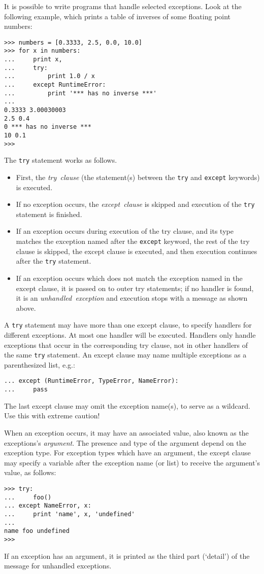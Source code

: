 It is possible to write programs that handle selected exceptions.
Look at the following example, which prints a table of inverses of
some floating point numbers:
\bcode\begin{verbatim}
>>> numbers = [0.3333, 2.5, 0.0, 10.0]
>>> for x in numbers:
...     print x,
...     try:
...         print 1.0 / x
...     except RuntimeError:
...         print '*** has no inverse ***'
...
0.3333 3.00030003
2.5 0.4
0 *** has no inverse ***
10 0.1
>>>
\end{verbatim}\ecode
The {\tt try} statement works as follows.
\begin{itemize}
\item
First, the
{\em try\ clause}
(the statement(s) between the {\tt try} and {\tt except} keywords) is
executed.
\item
If no exception occurs, the
{\em except\ clause}
is skipped and execution of the {\tt try} statement is finished.
\item
If an exception occurs during execution of the try clause, and its
type matches the exception named after the {\tt except} keyword, the
rest of the try clause is skipped, the except clause is executed, and
then execution continues after the {\tt try} statement.
\item
If an exception occurs which does not match the exception named in the
except clause, it is passed on to outer try statements; if no handler is
found, it is an
{\em unhandled\ exception}
and execution stops with a message as shown above.
\end{itemize}
A {\tt try} statement may have more than one except clause, to specify
handlers for different exceptions.
At most one handler will be executed.
Handlers only handle exceptions that occur in the corresponding try
clause, not in other handlers of the same {\tt try} statement.
An except clause may name multiple exceptions as a parenthesized list,
e.g.:
\bcode\begin{verbatim}
... except (RuntimeError, TypeError, NameError):
...     pass
\end{verbatim}\ecode
The last except clause may omit the exception name(s), to serve as a
wildcard.
Use this with extreme caution!

When an exception occurs, it may have an associated value, also known as
the exceptions's
{\em argument}.
The presence and type of the argument depend on the exception type.
For exception types which have an argument, the except clause may
specify a variable after the exception name (or list) to receive the
argument's value, as follows:
\bcode\begin{verbatim}
>>> try:
...     foo()
... except NameError, x:
...     print 'name', x, 'undefined'
...
name foo undefined
>>>
\end{verbatim}\ecode
If an exception has an argument, it is printed as the third part
(`detail') of the message for unhandled exceptions.

